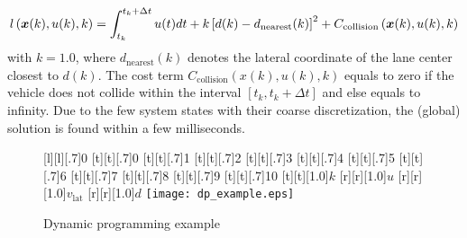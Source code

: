 \begin{align*}
l \left(\boldsymbol{x}(k),u(k),k\right) = \int_{t_k}^{t_k+\Delta t}{u(t) dt}+k\left[d(k)-d_\mathrm{nearest}(k)\right]^2 +C_\mathrm{collision}\left(\boldsymbol{x}(k),u(k),k\right)
\end{align*}
with $k=1.0$, where $d_\mathrm{nearest}(k)$ denotes the lateral coordinate of the lane center closest to $d(k)$. 
The cost term $C_\mathrm{collision} \left(x(k),u(k),k\right)$ equals to zero if the vehicle does not collide within the interval $\left[t_k,t_k+\Delta t\right]$ and else equals to infinity. 
Due to the few system states with their coarse discretization, the (global) solution is found within a few milliseconds.

\begin{figure}[h]
	[l][.7]{0}
	[t][.7]{0}
	[t][.7]{1}
	[t][.7]{2}
	[t][.7]{3}
	[t][.7]{4}
	[t][.7]{5}
	[t][.7]{6}
	[t][.7]{7}
	[t][.7]{8}
	[t][.7]{9}
	[t][.7]{10}
	[t][1.0]{$k$}
	[r][1.0]{$u$}
	[r][1.0]{$v_\text{lat}$}
	[r][1.0]{$d$}
	\centering
	\centering
  	\texttt{[image: dp\_example.eps]}
	\caption[Dynamic programming example]{Dynamic programming example}
	\label{fig:dynamische_programmierung_veranschaulichung}
\end{figure} 


